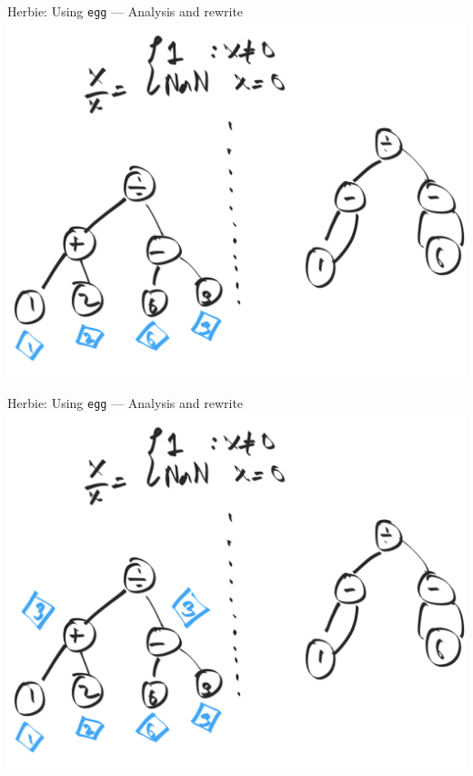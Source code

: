 \documentclass[8pt]{beamer}
\newcommand{\egg}{\texttt{egg} }
\begin{document}
\begin{frame}[fragile]{Herbie: Using \egg --- Analysis and rewrite}
\includegraphics[width=\textwidth]{./rewrite-2.png}
\end{frame}


\begin{frame}[fragile]{Herbie: Using \egg --- Analysis and rewrite}
\includegraphics[width=\textwidth]{./rewrite-3.png}
\end{frame}
\end{document}

